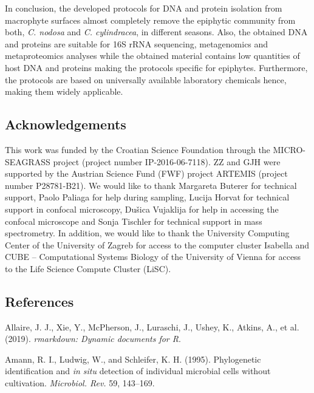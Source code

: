 \documentclass[12pt,]{article}
\begin{document}
In conclusion, the developed protocols for DNA and protein isolation
from macrophyte surfaces almost completely remove the epiphytic
community from both, \emph{C. nodosa} and \emph{C. cylindracea}, in
different seasons. Also, the obtained DNA and proteins are suitable for
16S rRNA sequencing, metagenomics and metaproteomics analyses while the
obtained material contains low quantities of host DNA and proteins
making the protocols specific for epiphytes. Furthermore, the protocols
are based on universally available laboratory chemicals hence, making
them widely applicable.

\hypertarget{acknowledgements}{%
\subsection{Acknowledgements}\label{acknowledgements}}

This work was funded by the Croatian Science Foundation through the
MICRO-SEAGRASS project (project number IP-2016-06-7118). ZZ and GJH were
supported by the Austrian Science Fund (FWF) project ARTEMIS (project
number P28781-B21). We would like to thank Margareta Buterer for
technical support, Paolo Paliaga for help during sampling, Lucija Horvat
for technical support in confocal microscopy, Dušica Vujaklija for help
in accessing the confocal microscope and Sonja Tischler for technical
support in mass spectrometry. In addition, we would like to thank the
University Computing Center of the University of Zagreb for access to
the computer cluster Isabella and CUBE -- Computational Systems Biology
of the University of Vienna for access to the Life Science Compute
Cluster (LiSC).

\newpage

\hypertarget{references}{%
\subsection{References}\label{references}}

 \setlength{\emergencystretch}{3.5em}

\hypertarget{refs}{}
\leavevmode\hypertarget{ref-Allaire2019}{}%
Allaire, J. J., Xie, Y., McPherson, J., Luraschi, J., Ushey, K., Atkins,
A., et al. (2019). \emph{rmarkdown: Dynamic documents for R}.

\leavevmode\hypertarget{ref-Amann1995}{}%
Amann, R. I., Ludwig, W., and Schleifer, K. H. (1995). Phylogenetic
identification and \emph{in situ} detection of individual microbial
cells without cultivation. \emph{Microbiol. Rev.} 59, 143--169.
\end{document}
